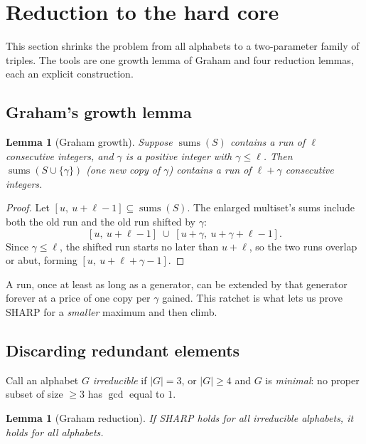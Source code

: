 \documentclass[11pt,reqno]{amsart}
\theoremstyle{plain}
\newtheorem{lemma}[theorem]{Lemma}
\theoremstyle{definition}
\theoremstyle{remark}
\newcommand{\ssum}{\operatorname{sums}}
\begin{document}
\section{Reduction to the hard core}\label{sec:sharp-reduction}

This section shrinks the problem from all alphabets to a two-parameter family of
triples. The tools are one growth lemma of Graham and four reduction lemmas, each
an explicit construction.

\subsection{Graham's growth lemma}

\begin{lemma}[Graham growth]\label{lem:graham-friendly}
Suppose $\ssum(S)$ contains a run of $\ell$ consecutive integers, and $\gamma$ is
a positive integer with $\gamma \le \ell$. Then $\ssum(S \cup \{\gamma\})$ (one
new copy of $\gamma$) contains a run of $\ell + \gamma$ consecutive integers.
\end{lemma}

\begin{proof}
Let $[u,\ u + \ell - 1] \subseteq \ssum(S)$. The enlarged multiset's sums include
both the old run and the old run shifted by $\gamma$:
\[
  [u,\ u + \ell - 1] \;\cup\; [u + \gamma,\ u + \gamma + \ell - 1] .
\]
Since $\gamma \le \ell$, the shifted run starts no later than $u + \ell$, so the
two runs overlap or abut, forming $[u,\ u + \ell + \gamma - 1]$.
\end{proof}

A run, once at least as long as a generator, can be extended by that generator
forever at a price of one copy per $\gamma$ gained. This ratchet is what lets us
prove SHARP for a \emph{smaller} maximum and then climb.

\subsection{Discarding redundant elements}

Call an alphabet $G$ \emph{irreducible} if $|G| = 3$, or $|G| \ge 4$ and $G$ is
\emph{minimal}: no proper subset of size $\ge 3$ has $\gcd$ equal to $1$.

\begin{lemma}[Graham reduction]\label{lem:graham-red}
If SHARP holds for all irreducible alphabets, it holds for all alphabets.
\end{lemma}
\end{document}
